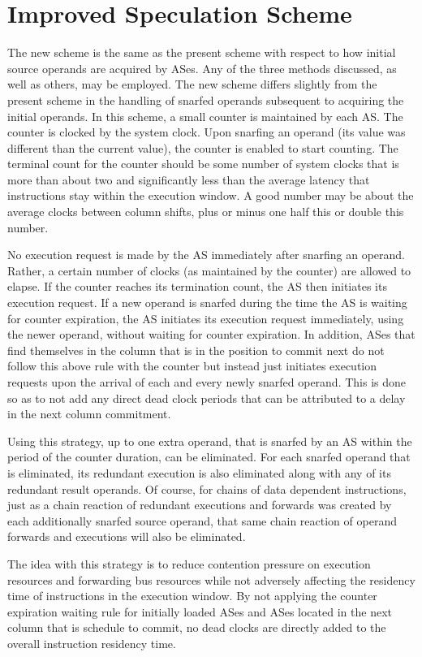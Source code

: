 \documentclass[10pt,dvips]{article}
\begin{document}
\section{Improved Speculation Scheme}
%
The new scheme is the same as the present scheme with respect
to how initial source operands are acquired by ASes.
Any of the three methods discussed, as well as others, may be
employed.  The new scheme differs slightly from the present
scheme in the handling of snarfed operands
subsequent to acquiring the initial operands.
In this scheme, a small counter is maintained by each AS.
The counter is clocked by the system clock.
Upon snarfing an operand (its value was different than the
current value), the counter is enabled to start counting.
The terminal count for the counter should be some number of
system clocks that is more than about two and significantly less than
the average latency that instructions stay within the execution
window.  A good number may be about the average
clocks between column shifts, plus or minus one half this or double this
number.  

No execution request is made by the AS immediately after snarfing an operand.
Rather, a certain number of clocks (as maintained by the counter) 
are allowed to elapse.  If the counter reaches its termination count,
the AS then initiates its execution request.  If a new operand is
snarfed during the time the AS is waiting for counter expiration,
the AS initiates its execution request immediately, using the newer operand,
without waiting for counter expiration.  In addition, ASes that find
themselves in the column that is in the position to commit next
do not follow this above rule with the counter but instead just
initiates execution requests upon the arrival of each and every
newly snarfed operand.  This is done so as to not add any direct
dead clock periods that can be attributed to a delay in the
next column commitment.

Using this strategy, up to one extra operand, that is snarfed by an AS
within the period of the counter duration, can be eliminated.
For each snarfed operand that is eliminated, its
redundant execution is also eliminated along with any of its
redundant result operands.  Of course, for chains of data
dependent instructions, just as a chain reaction of redundant
executions and forwards was created by each additionally snarfed
source operand, that same chain reaction of operand forwards
and executions will also be eliminated.

The idea with this strategy is to reduce contention pressure on
execution resources and forwarding bus resources while not
adversely affecting the residency time of instructions in the
execution window.  
By not applying the counter
expiration waiting rule for initially loaded ASes and ASes 
located in the next column that is schedule to commit, no dead
clocks are directly added to the overall instruction residency
time.
%
\end{document}
